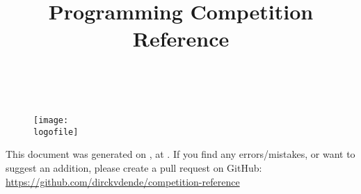 \documentclass[dvipsnames]{article}
\title{Programming Competition Reference}
\begin{document}

\setlength{\abovedisplayskip}{0pt}
\setlength{\belowdisplayskip}{0pt}
\setlength{\abovedisplayshortskip}{0pt}
\setlength{\belowdisplayshortskip}{0pt}


\setlength{\columnseprule}{1pt}
\setlength{\columnsep}{0.5cm}
\def\columnseprulecolor{\color{gray}}

\begin{multicols}{2}

{\hspace{1pt}}


\begin{center}

    {\bfseries \fontsize{19}{23}\selectfont \doctitle}
    
    \vspace{0pt}
    
    \textsl{\small \authorname \\ \teamname}

    \begin{figure}[H]
    \centering
    \texttt{[image: \\logofile]}
    \label{fig:logo}
\end{figure}
\end{center}


\makeatletter
\renewcommand\tableofcontents{
    \@starttoc{toc}
}
\makeatother
{}
\setcounter{tocdepth}{2}
{\tableofcontents}




\end{multicols}


{
    \color{gray}
    \setlength\topsep{0pt}
    \setlength\parskip{0pt}
    \begin{center}
        This document was generated on \DTMtoday, at \DTMcurrenttime. If you find any errors/mistakes, or want to suggest an addition, please create a pull request on GitHub: \url{https://github.com/dirckvdende/competition-reference}
    \end{center}
}

\label{LastPage}
\end{document}

